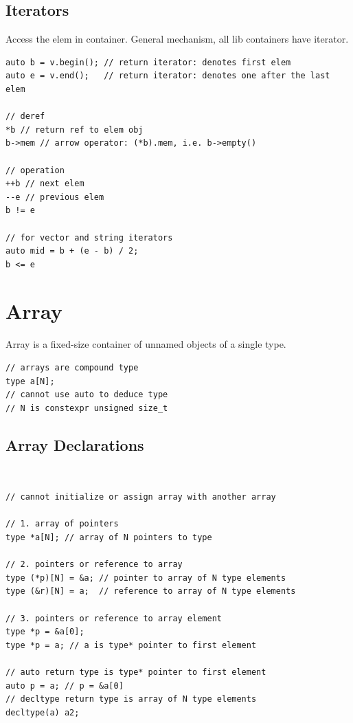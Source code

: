 \documentclass{blog}
\begin{document}
\subsection{Iterators}
\begin{definition}[iterator]
    Access the elem in container. General mechanism, all lib containers have iterator.
    \begin{verbatim}
auto b = v.begin(); // return iterator: denotes first elem
auto e = v.end();   // return iterator: denotes one after the last elem

// deref
*b // return ref to elem obj
b->mem // arrow operator: (*b).mem, i.e. b->empty()

// operation
++b // next elem
--e // previous elem
b != e

// for vector and string iterators
auto mid = b + (e - b) / 2;
b <= e
\end{verbatim}
\end{definition}

\section{Array}
\begin{definition}[array]
    Array is a fixed-size container of unnamed objects of a single type.
    \begin{verbatim}
// arrays are compound type
type a[N];
// cannot use auto to deduce type
// N is constexpr unsigned size_t
\end{verbatim}
\end{definition}

\subsection{Array Declarations}
\begin{definition}~
    \begin{verbatim}
// cannot initialize or assign array with another array

// 1. array of pointers
type *a[N]; // array of N pointers to type

// 2. pointers or reference to array
type (*p)[N] = &a; // pointer to array of N type elements
type (&r)[N] = a;  // reference to array of N type elements

// 3. pointers or reference to array element
type *p = &a[0];
type *p = a; // a is type* pointer to first element

// auto return type is type* pointer to first element
auto p = a; // p = &a[0]
// decltype return type is array of N type elements
decltype(a) a2;
\end{verbatim}
\end{definition}
\end{document}
